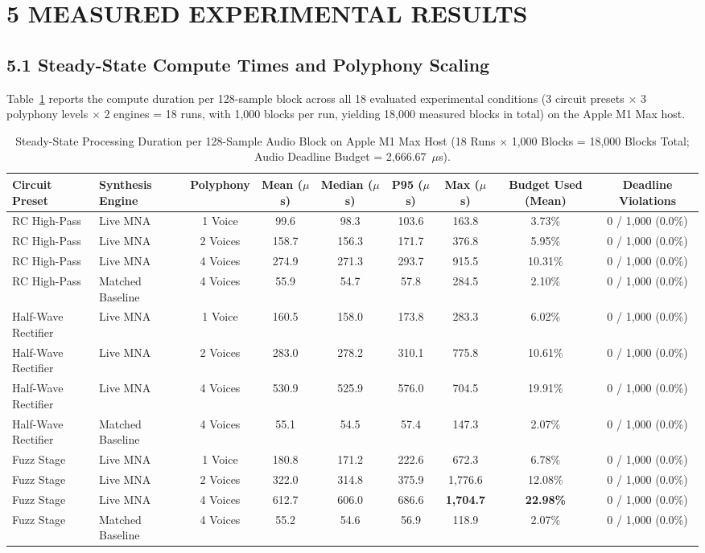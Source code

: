 \documentclass[fleqn,draft]{jaes}
\begin{document}
\section{5 MEASURED EXPERIMENTAL RESULTS}

\subsection{5.1 Steady-State Compute Times and Polyphony Scaling}
Table~\ref{tab:steady_state} reports the compute duration per 128-sample block across all 18 evaluated experimental conditions (3 circuit presets $\times$ 3 polyphony levels $\times$ 2 engines = 18 runs, with 1,000 blocks per run, yielding 18,000 measured blocks in total) on the Apple M1 Max host.

\begin{table}[t]
\caption{Steady-State Processing Duration per 128-Sample Audio Block on Apple M1 Max Host (18 Runs $\times$ 1,000 Blocks = 18,000 Blocks Total; Audio Deadline Budget = 2,666.67~$\mu$s).}
\label{tab:steady_state}
\centering
\begin{tabular}{llccccccc}
\toprule
Circuit Preset & Synthesis Engine & Polyphony & Mean ($\mu$s) & Median ($\mu$s) & P95 ($\mu$s) & Max ($\mu$s) & Budget Used (Mean) & Deadline Violations \\
\midrule
RC High-Pass & Live MNA & 1 Voice & 99.6 & 98.3 & 103.6 & 163.8 & 3.73\% & 0 / 1,000 (0.0\%) \\
RC High-Pass & Live MNA & 2 Voices & 158.7 & 156.3 & 171.7 & 376.8 & 5.95\% & 0 / 1,000 (0.0\%) \\
RC High-Pass & Live MNA & 4 Voices & 274.9 & 271.3 & 293.7 & 915.5 & 10.31\% & 0 / 1,000 (0.0\%) \\
RC High-Pass & Matched Baseline & 4 Voices & 55.9 & 54.7 & 57.8 & 284.5 & 2.10\% & 0 / 1,000 (0.0\%) \\
\midrule
Half-Wave Rectifier & Live MNA & 1 Voice & 160.5 & 158.0 & 173.8 & 283.3 & 6.02\% & 0 / 1,000 (0.0\%) \\
Half-Wave Rectifier & Live MNA & 2 Voices & 283.0 & 278.2 & 310.1 & 775.8 & 10.61\% & 0 / 1,000 (0.0\%) \\
Half-Wave Rectifier & Live MNA & 4 Voices & 530.9 & 525.9 & 576.0 & 704.5 & 19.91\% & 0 / 1,000 (0.0\%) \\
Half-Wave Rectifier & Matched Baseline & 4 Voices & 55.1 & 54.5 & 57.4 & 147.3 & 2.07\% & 0 / 1,000 (0.0\%) \\
\midrule
Fuzz Stage & Live MNA & 1 Voice & 180.8 & 171.2 & 222.6 & 672.3 & 6.78\% & 0 / 1,000 (0.0\%) \\
Fuzz Stage & Live MNA & 2 Voices & 322.0 & 314.8 & 375.9 & 1,776.6 & 12.08\% & 0 / 1,000 (0.0\%) \\
Fuzz Stage & Live MNA & 4 Voices & 612.7 & 606.0 & 686.6 & \textbf{1,704.7} & \textbf{22.98\%} & 0 / 1,000 (0.0\%) \\
Fuzz Stage & Matched Baseline & 4 Voices & 55.2 & 54.6 & 56.9 & 118.9 & 2.07\% & 0 / 1,000 (0.0\%) \\
\bottomrule
\end{tabular}
\end{table}
\end{document}
